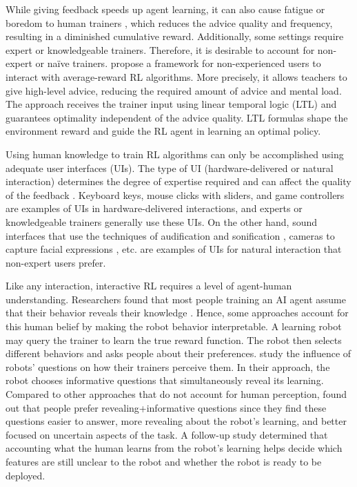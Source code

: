 \documentclass[twoside,11pt]{article}
\begin{document}
While giving feedback speeds up agent learning, it can also cause fatigue or boredom to human trainers \citep{akalin:21}, which reduces the advice quality and frequency, resulting in a diminished cumulative reward. Additionally, some settings require expert or knowledgeable trainers. Therefore, it is desirable to account for non-expert or na\"ive trainers. \cite{jiang:21} propose a framework for non-experienced users to interact with average-reward RL algorithms. More precisely, it allows teachers to give high-level advice, reducing the required amount of advice and mental load. The approach receives the trainer input using linear temporal logic (LTL) and guarantees optimality independent of the advice quality. LTL formulas shape the environment reward and guide the RL agent in learning an optimal policy.

Using human knowledge to train RL algorithms can only be accomplished using adequate user interfaces (UIs). The type of UI (hardware-delivered or natural interaction) determines the degree of expertise required and can affect the quality of the feedback \citep{lin:20}. Keyboard keys, mouse clicks with sliders, and game controllers are examples of UIs in hardware-delivered interactions, and experts or knowledgeable trainers generally use these UIs. On the other hand, sound interfaces that use the techniques of audification and sonification \citep{Hermann:2011:Sonification, Saranti:2009:QuantumHarmonicOscSonification,kartoun:10,Scurto:2021:DesigningDeepRLHumanParameterExploration}, cameras to capture facial expressions \citep{arakawa:18}, etc. are examples of UIs for natural interaction that non-expert users prefer. 

Like any interaction, interactive RL requires a level of agent-human understanding. Researchers found that most people training an AI agent assume that their behavior reveals their knowledge \citep{habibian:21}. Hence, some approaches account for this human belief by making the robot behavior interpretable. A learning robot may query the trainer to learn the true reward function. The robot then selects different behaviors and asks people about their preferences. \cite{habibian:21} study the influence of robots' questions on how their trainers perceive them. In their approach, the robot chooses informative questions that simultaneously reveal its learning. Compared to other approaches that do not account for human perception, \cite{habibian:21} found out that people prefer revealing+informative questions since they find these questions easier to answer, more revealing about the robot's learning, and better focused on uncertain aspects of the task. A follow-up study determined that accounting what the human learns from the robot's learning helps decide which features are still unclear to the robot and whether the robot is ready to be deployed. 
\end{document}
